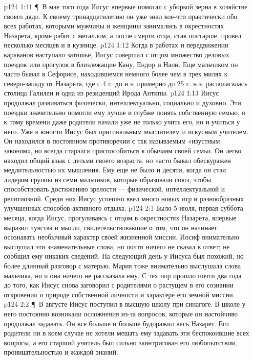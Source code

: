 \vs p124 1:11 \P\ В мае того года Иисус впервые помогал с уборкой зерна в хозяйстве своего дяди. К своему тринадцатилетию он уже знал кое\hyp{}что практически обо всех работах, которыми мужчины и женщины занимались в окрестностях Назарета, кроме работ с металлом, а после смерти отца, став постарше, провел несколько месяцев и в кузнице.
\vs p124 1:12 Когда в работах и передвижении караванов наступало затишье, Иисус совершал с отцом множество деловых поездок или прогулок в близлежащие Кану, Ендор и Наин. Еще мальчиком он часто бывал в Сефорисе, находившемся немного более чем в трех милях к северо\hyp{}западу от Назарета, где с 4 г. до н.э. примерно до 25 г. н.э. располагалась столица Галилеи и одна из резиденций Ирода Антипы.
\vs p124 1:13 Иисус продолжал развиваться физически, интеллектуально, социально и духовно. Эти поездки значительно помогли ему лучше и глубже понять собственную семью, и к тому времени даже родители начали уже не только учить его, но и учиться у него. Уже в юности Иисус был оригинальным мыслителем и искусным учителем. Он находился в постоянном противоречии с так называемым «изустным законом», но всегда старался приспособиться к обычаям своей семьи. Он легко находил общий язык с детьми своего возраста, но часто бывал обескуражен медлительностью их мышления. Ему еще не было и десяти, когда он стал лидером группы из семи мальчиков, которые образовали союз, чтобы способствовать достижению зрелости --- физической, интеллектуальной и религиозной. Среди них Иисус успешно ввел много новых игр и разнообразных улучшенных способов активного отдыха.
\vs p124 2:1 Было 5 июля, первая суббота месяца, когда Иисус, прогуливаясь с отцом в окрестностях Назарета, впервые выразил чувства и мысли, свидетельствовавшие о том, что он начинает осознавать необычный характер своей жизненной миссии. Иосиф внимательно выслушал эти знаменательные слова, но почти ничего не сказал в ответ; не сообщил ему никаких сведений. На следующий день у Иисуса был похожий, но более длинный разговор с матерью. Мария тоже внимательно выслушала слова мальчика, но и она ничего не рассказала ему. С тех пор прошло почти два года до того, как Иисус снова заговорил с родителями о растущем в его сознании откровении о природе собственной личности и характере его земной миссии.
\vs p124 2:2 \P\ В августе Иисус поступил в высшую школу при синагоге. В школе у него постоянно возникали осложнения из\hyp{}за вопросов, которые он настойчиво продолжал задавать. Он все больше и больше будоражил весь Назарет. Его родители ни в коем случае не хотели мешать ему задавать эти беспокоившие всех вопросы, а его старший учитель был сильно заинтригован его любопытством, проницательностью и жаждой знаний.
